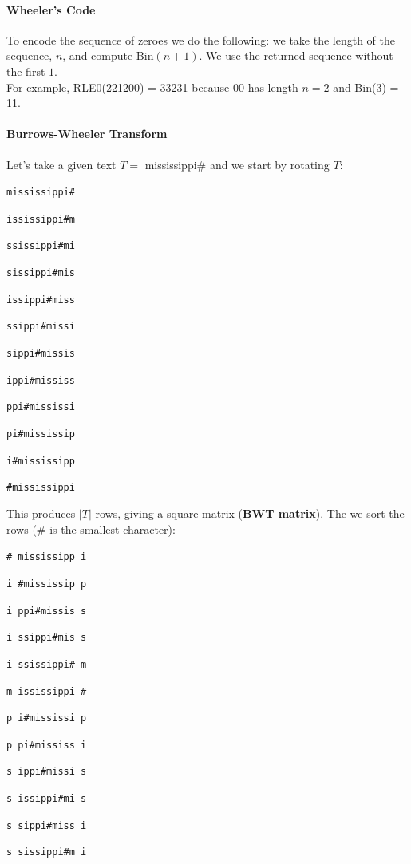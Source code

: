 \documentclass[10pt]{report}
\begin{document}
\paragraph{Wheeler's Code} To encode the sequence of zeroes we do the following: we take the length of the sequence, $n$, and compute Bin$(n+1)$. We use the returned sequence without the first $1$.\\
For example, RLE0(221200) = 33231 because 00 has length $n=2$ and Bin(3) = 11.
\paragraph{Burrows-Wheeler Transform} Let's take a given text $T=$ mississippi\# and we start by rotating $T$:
\begin{list}{}{}
	\item \texttt{mississippi\#}
	\item \texttt{ississippi\#m}
	\item \texttt{ssissippi\#mi}
	\item \texttt{sissippi\#mis}
	\item \texttt{issippi\#miss}
	\item \texttt{ssippi\#missi}
	\item \texttt{sippi\#missis}
	\item \texttt{ippi\#mississ}
	\item \texttt{ppi\#mississi}
	\item \texttt{pi\#mississip}
	\item \texttt{i\#mississipp}
	\item \texttt{\#mississippi}
\end{list}
This produces $|T|$ rows, giving a square matrix (\textbf{BWT matrix}). The we sort the rows (\# is the smallest character):
\begin{list}{}{}
	\item \texttt{\# mississipp i}
	\item \texttt{i \#mississip p}
	\item \texttt{i ppi\#missis s}
	\item \texttt{i ssippi\#mis s}
	\item \texttt{i ssissippi\# m}
	\item \texttt{m ississippi \#}
	\item \texttt{p i\#mississi p}
	\item \texttt{p pi\#mississ i}
	\item \texttt{s ippi\#missi s}
	\item \texttt{s issippi\#mi s}
	\item \texttt{s sippi\#miss i}
	\item \texttt{s sissippi\#m i}
\end{list}
\end{document}
